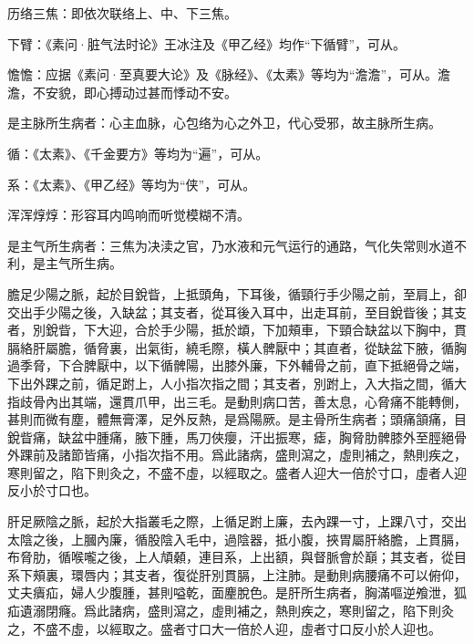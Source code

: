 \documentclass[12pt]{ctexbook}%
\begin{document}
\begin{jiaozhu}
	\item 历络三焦：即依次联络上、中、下三焦。
	\item 下臂：《素问·脏气法时论》王冰注及《甲乙经》均作“下循臂”，可从。
	\item 憺憺：应据《素问·至真要大论》及《脉经》、《太素》等均为“澹澹”，可从。澹澹，不安貌，即心搏动过甚而悸动不安。
	\item 是主脉所生病者：心主血脉，心包络为心之外卫，代心受邪，故主脉所生病。
	\item 循：《太素》、《千金要方》等均为“遍”，可从。
	\item 系：《太素》、《甲乙经》等均为“侠”，可从。
	\item 浑浑焞焞：形容耳内鸣响而听觉模糊不清。
	\item 是主气所生病者：三焦为决渎之官，乃水液和元气运行的通路，气化失常则水道不利，是主气所生病。
\end{jiaozhu}


\begin{yuanwen}
膽足少陽之脈，起於目銳眥，上抵頭角，下耳後，循頸行手少陽之前，至肩上，卻交出手少陽之後，入缺盆；其支者，從耳後入耳中，出走耳前，至目銳眥後；其支者，別銳眥，下大迎，合於手少陽，抵於䪼，下加頰車，下頸合缺盆以下胸中，貫膈絡肝屬膽，循脅裏，出氣街，繞毛際，橫人髀厭中；其直者，從缺盆下腋，循胸過季脅，下合脾厭中，以下循髀陽，出膝外廉，下外輔骨之前，直下抵絕骨之端，下出外踝之前，循足跗上，人小指次指之間；其支者，別跗上，入大指之間，循大指歧骨內出其端，還貫爪甲，出三毛。是動則病口苦，善太息，心脅痛不能轉側，甚則而微有塵，體無膏澤，足外反熱，是爲陽厥。是主骨所生病者；頭痛頷痛，目銳眥痛，缺盆中腫痛，腋下腫，馬刀俠癭，汗出振寒，瘧，胸脅肋髀膝外至脛絕骨外踝前及諸節皆痛，小指次指不用。爲此諸病，盛則瀉之，虛則補之，熱則疾之，寒則留之，陷下則灸之，不盛不虛，以經取之。盛者人迎大一倍於寸口，虛者人迎反小於寸口也。

肝足厥陰之脈，起於大指叢毛之際，上循足跗上廉，去內踝一寸，上踝八寸，交出太陰之後，上膕內廉，循股陰入毛中，過陰器，抵小腹，挾胃屬肝絡膽，上貫膈，布脅肋，循喉嚨之後，上人頏顙，連目系，上出額，與督脈會於巔；其支者，從目系下頰裏，環唇内；其支者，復從肝別貫膈，上注肺。是動則病腰痛不可以俯仰，丈夫㿉疝，婦人少腹腫，甚則嗌乾，面麈脫色。是肝所生病者，胸滿嘔逆飧泄，狐疝遺溺閉癃。爲此諸病，盛則瀉之，虛則補之，熱則疾之，寒則留之，陷下則灸之，不盛不虛，以經取之。盛者寸口大一倍於人迎，虛者寸口反小於人迎也。
\end{yuanwen}
\end{document}
